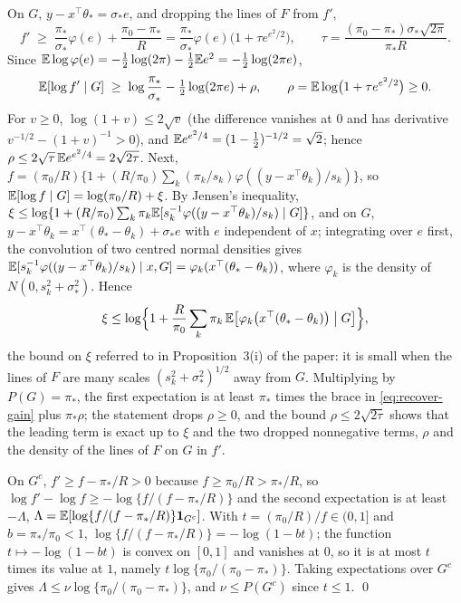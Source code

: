 On $G$, $y-x^{\top}\theta_\ast=\sigma_\ast e$, and dropping the lines of $F$ from $f'$,
\[
f'\;\ge\;\frac{\pi_\ast}{\sigma_\ast}\varphi(e)+\frac{\pi_0-\pi_\ast}{R}
=\frac{\pi_\ast}{\sigma_\ast}\varphi(e)\bigl(1+\tau e^{e^{2}/2}\bigr),
\qquad \tau=\frac{(\pi_0-\pi_\ast)\sigma_\ast\sqrt{2\pi}}{\pi_\ast R}.
\]
Since $\mathbb{E}\log\varphi(e)=-\tfrac12\log(2\pi)-\tfrac12\mathbb{E} e^{2}=-\tfrac12\log(2\pi e)$,
\[
\mathbb{E}[\log f'\mid G]\;\ge\;\log\frac{\pi_\ast}{\sigma_\ast}-\tfrac12\log(2\pi e)+\rho,
\qquad \rho=\mathbb{E}\log\bigl(1+\tau e^{e^{2}/2}\bigr)\ge0 .
\]
For $v\ge0$, $\log(1+v)\le2\sqrt v$ (the difference vanishes at $0$ and has derivative
$v^{-1/2}-(1+v)^{-1}>0$), and $\mathbb{E} e^{e^{2}/4}=(1-\tfrac12)^{-1/2}=\sqrt2$; hence
$\rho\le2\sqrt\tau\,\mathbb{E} e^{e^{2}/4}=2\sqrt{2\tau}$. Next, $f=(\pi_0/R)\{1+(R/\pi_0)\sum_k
(\pi_k/s_k)\varphi((y-x^{\top}\theta_k)/s_k)\}$, so $\mathbb{E}[\log f\mid G]=\log(\pi_0/R)+\xi$. By
Jensen's inequality, $\xi\le\log\{1+(R/\pi_0)\sum_k\pi_k\mathbb{E}[s_k^{-1}\varphi((y-x^{\top}\theta_k)/s_k)\mid G]\}$,
and on $G$, $y-x^{\top}\theta_k=x^{\top}(\theta_\ast-\theta_k)+\sigma_\ast e$ with $e$
independent of $x$; integrating over $e$ first, the convolution of two centred normal
densities gives $\mathbb{E}[s_k^{-1}\varphi((y-x^{\top}\theta_k)/s_k)\mid x,G]=\varphi_k(x^{\top}(\theta_\ast-\theta_k))$,
where $\varphi_k$ is the density of $N(0,s_k^{2}+\sigma_\ast^{2})$. Hence
\[
\xi\le\log\Bigl\{1+\frac{R}{\pi_0}\sum_{k}\pi_k\,\mathbb{E}\bigl[\varphi_k\bigl(x^{\top}(\theta_\ast-\theta_k)\bigr)\bigm| G\bigr]\Bigr\},
\]
the bound on $\xi$ referred to in Proposition~3(i) of the paper: it is small when the lines of
$F$ are many scales $(s_k^2+\sigma_\ast^2)^{1/2}$ away from $G$. Multiplying by $P(G)=\pi_\ast$, the first expectation is at
least $\pi_\ast$ times the brace in \eqref{eq:recover-gain} plus $\pi_\ast\rho$; the
statement drops $\rho\ge0$, and the bound $\rho\le2\sqrt{2\tau}$ shows that the leading
term is exact up to $\xi$ and the two dropped nonnegative terms, $\rho$ and the density
of the lines of $F$ on $G$ in $f'$.

On $G^{c}$, $f'\ge f-\pi_\ast/R>0$ because $f\ge\pi_0/R>\pi_\ast/R$, so
$\log f'-\log f\ge-\log\{f/(f-\pi_\ast/R)\}$ and the second expectation is at least
$-\Lambda$, $\Lambda=\mathbb{E}[\log\{f/(f-\pi_\ast/R)\}\mathbf{1}_{G^{c}}]$. With $t=(\pi_0/R)/f\in(0,1]$
and $b=\pi_\ast/\pi_0<1$, $\log\{f/(f-\pi_\ast/R)\}=-\log(1-bt)$; the function
$t\mapsto-\log(1-bt)$ is convex on $[0,1]$ and vanishes at $0$, so it is at most $t$ times
its value at $1$, namely $t\log\{\pi_0/(\pi_0-\pi_\ast)\}$. Taking expectations over $G^{c}$
gives $\Lambda\le\nu\log\{\pi_0/(\pi_0-\pi_\ast)\}$, and $\nu\le P(G^{c})$ since $t\le1$. \qed

